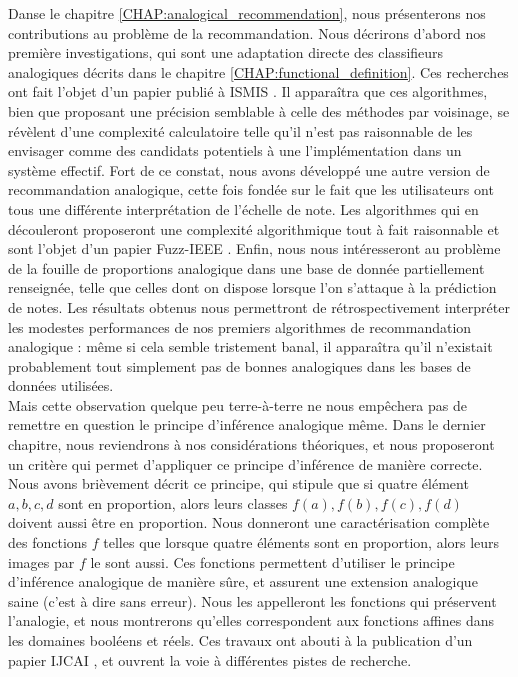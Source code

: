 Danse le chapitre \ref{CHAP:analogical_recommendation}, nous présenterons nos
contributions au problème de la recommandation. Nous décrirons d'abord nos
première investigations, qui sont une adaptation directe des classifieurs
analogiques décrits dans le chapitre \ref{CHAP:functional_definition}. Ces
recherches ont fait l'objet d'un papier publié à ISMIS \cite{HugPraRicISMIS15}.
Il apparaîtra que ces algorithmes, bien que proposant une précision semblable à
celle des méthodes par voisinage, se révèlent d'une complexité calculatoire
telle qu'il n'est pas raisonnable de les envisager comme des candidats
potentiels à une l'implémentation dans un système effectif. Fort de ce constat,
nous avons développé une autre version de recommandation analogique, cette fois
fondée sur le fait que les utilisateurs ont tous une différente interprétation
de l'échelle de note. Les algorithmes qui en découleront proposeront une
complexité algorithmique tout à fait raisonnable et sont l'objet d'un papier
Fuzz-IEEE  \cite{HugPraRicSerFuzzIEEE16}. Enfin, nous nous intéresseront au
problème de la fouille de proportions analogique dans une base de donnée
partiellement renseignée, telle que celles dont on dispose lorsque l'on
s'attaque à la prédiction de notes. Les résultats obtenus nous permettront de
rétrospectivement interpréter les modestes performances de nos premiers
algorithmes de recommandation analogique : même si cela semble tristement
banal, il apparaîtra qu'il n'existait probablement tout simplement pas de
bonnes analogiques dans les bases de données utilisées.\\


Mais cette observation quelque peu terre-à-terre ne nous empêchera pas de
remettre en question le principe d'inférence analogique même. Dans le dernier
chapitre, nous reviendrons à nos considérations théoriques, et nous proposeront
un critère qui permet d'appliquer ce principe d'inférence de manière correcte.
Nous avons brièvement décrit ce principe, qui stipule que si quatre élément $a,
b, c, d$ sont en proportion, alors leurs classes $f(a), f(b), f(c), f(d)$
doivent aussi être en proportion. Nous donneront une caractérisation complète
des fonctions $f$ telles que lorsque quatre éléments sont en proportion, alors
leurs images par $f$ le sont aussi. Ces fonctions permettent d'utiliser le
principe d'inférence analogique de manière sûre, et assurent une extension
analogique saine (c'est à dire sans erreur). Nous les appelleront les fonctions
qui préservent l'analogie, et nous montrerons qu'elles correspondent aux
fonctions affines dans les domaines booléens et réels. Ces travaux ont
abouti à la publication d'un papier IJCAI \cite{CouHugPraRicIJCAI17}, et
ouvrent la voie à différentes pistes de recherche.
